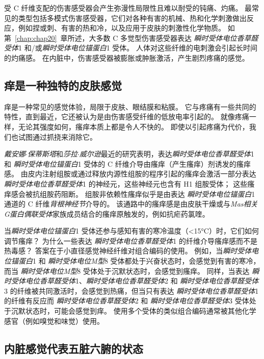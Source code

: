 受 C 纤维支配的伤害感受器会产生弥漫性局限性且难以耐受的钝痛、灼痛。
最常见的类型包括多模式伤害感受器，它们对各种有害的机械、热和化学刺激做出反应，例如捏或刺、有害的热和冷，以及应用于皮肤的刺激性化学物质。
如第~\ref{chap:chap20}~章所述，大多数 C 多觉型伤害感受器表达 \textit{瞬时受体电位香草醛受体}1 和/或\textit{瞬时受体电位锚蛋白}1 受体。
人体对这些纤维的电刺激会引起长时间的灼痛感。
在内脏中，伤害感受器被膨胀或肿胀激活，产生剧烈疼痛的感觉。



\subsection{痒是一种独特的皮肤感觉}

痒是一种常见的感觉体验，局限于皮肤、眼结膜和粘膜。 
它与疼痛有一些共同的特性，直到最近，它还被认为是由伤害感受纤维的低放电率引起的。
就像疼痛一样，无论其强度如何，瘙痒本质上都是令人不快的。
即使以引起疼痛为代价，我们也试图通过抓挠来消除它。


\textit{戴安娜$\cdot$保蒂斯塔}和\textit{莎拉$\cdot$威尔逊}最近的研究表明，表达\textit{瞬时受体电位香草醛受体}1 和 \textit{瞬时受体电位锚蛋白}1 受体的 C 纤维介导由瘙痒（产生瘙痒）剂诱发的瘙痒感。
由皮内注射组胺或通过释放内源性组胺的程序引起的瘙痒会激活一部分表达 \textit{瞬时受体电位香草醛受体}1 的神经元，这些神经元也含有 H1 组胺受体；
这些瘙痒感会被抗组胺药阻断。
组胺非依赖性瘙痒似乎是由表达 \textit{瞬时受体电位锚蛋白}1 通道的 C 纤维\textit{背根神经节}介导的。
该通路中的瘙痒感是由皮肤干燥或与\textit{Mas相关G蛋白偶联受体}家族成员结合的瘙痒原触发的，例如抗疟药氯喹。


当\textit{瞬时受体电位锚蛋白}1 受体还参与感知有害的寒冷温度（<15°C）时，它们如何调节瘙痒？
为什么一些表达 \textit{瞬时受体电位香草醛受体}1 的纤维介导瘙痒感而不是热毒感？
答案在于小直径感觉神经纤维对组合编码的使用。
例如，当\textit{瞬时受体电位锚蛋白}1 和 \textit{瞬时受体电位M型}8 受体都处于兴奋状态时，会感觉到有害的寒冷，而当 \textit{瞬时受体电位M型}8 受体处于沉默状态时，会感觉到瘙痒。
同样，当表达 \textit{瞬时受体电位香草醛受体}1、\textit{瞬时受体电位香草醛受体}2 和 \textit{瞬时受体电位香草醛受体}3 的纤维被共同激活时，会感觉到热痛，但当只有表达 \textit{瞬时受体电位香草醛受体}1 的纤维有反应而 \textit{瞬时受体电位香草醛受体}2 和 \textit{瞬时受体电位香草醛受体}3 受体处于沉默状态时，可能会感觉到痒。
使用多个受体的类似组合编码通常被其他化学感官（例如嗅觉和味觉）使用。



\subsection{内脏感觉代表五脏六腑的状态}

